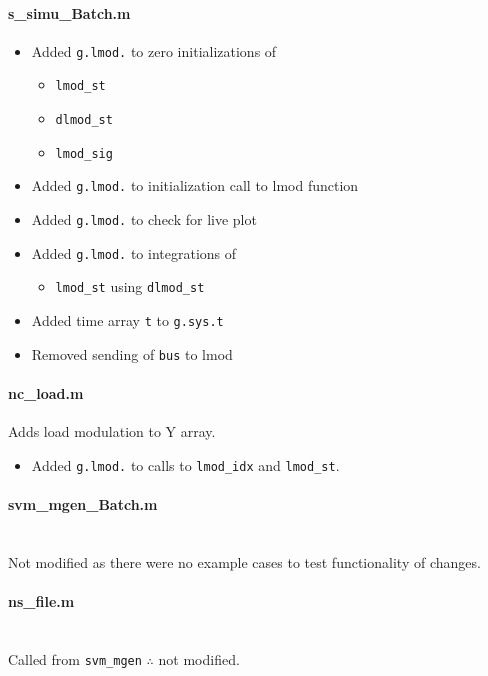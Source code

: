 \documentclass[12pt]{article}
\begin{document}
\paragraph{s\_simu\_Batch.m}
\begin{itemize}
\item Added \verb|g.lmod.| to zero initializations of
	\begin{itemize}
		\item \verb|lmod_st|
		\item \verb|dlmod_st|
		\item \verb|lmod_sig|
	\end{itemize}
\item Added \verb|g.lmod.| to initialization call to lmod function 
\item Added \verb|g.lmod.| to check for live plot


\item Added \verb|g.lmod.| to integrations of 
	\begin{itemize}
		\item \verb|lmod_st| using \verb|dlmod_st|
	\end{itemize}

\item Added time array \verb|t| to \verb|g.sys.t|

\item Removed sending of \verb|bus| to lmod
\end{itemize}

\paragraph{nc\_load.m}
Adds load modulation to Y array.
\begin{itemize}
\item Added \verb|g.lmod.| to calls to \verb|lmod_idx| and \verb|lmod_st|.
\end{itemize}

\paragraph{svm\_mgen\_Batch.m} \ \\
Not modified as there were no example cases to test functionality of changes.

\paragraph{ns\_file.m} \ \\
Called from \verb|svm_mgen| $\therefore$ not modified.
\end{document}
